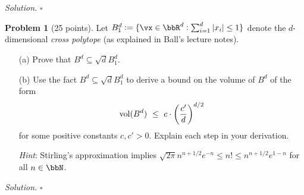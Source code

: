\documentclass[11pt]{article}
\newcommand{\vol}{\ensuremath{\operatorname{vol}}} %
\newcommand{\unitball}[1][d]{\ensuremath{B^{#1}}} %
\theoremstyle{definition}
\newtheorem{problem}{Problem}
\newenvironment{solution}{\noindent\emph{Solution.}}{\hfill$\square$}
\begin{document}
\begin{solution}
\end{solution}

\newpage


\begin{problem}[25 points]
  Let $B_1^d := \cbr[0]{ \vx \in \bbR^d : \sum_{i=1}^d |x_i| \leq 1 }$ denote the $d$-dimensional \emph{cross polytope} (as explained in Ball's lecture notes).
  \begin{enumerate}
    \item[(a)]
      Prove that $\unitball \subseteq \sqrt{d} B_1^d$.

    \item[(b)]
      Use the fact $\unitball \subseteq \sqrt{d} B_1^d$ to derive a bound on the volume of $\unitball$ of the form
      \[
        \vol(\unitball)
        \ \leq \
        c \cdot \del{ \frac{c'}{d} }^{d/2}
      \]
      for some positive constants $c, c' >0$.
      Explain each step in your derivation.

      \emph{Hint}: Stirling's approximation implies $\sqrt{2\pi} n^{n+1/2}e^{-n} \leq n! \leq n^{n+1/2}e^{1-n}$ for all $n \in \bbN$.
  \end{enumerate}
\end{problem}

\begin{solution}
\end{solution}

\newpage

\end{document}
